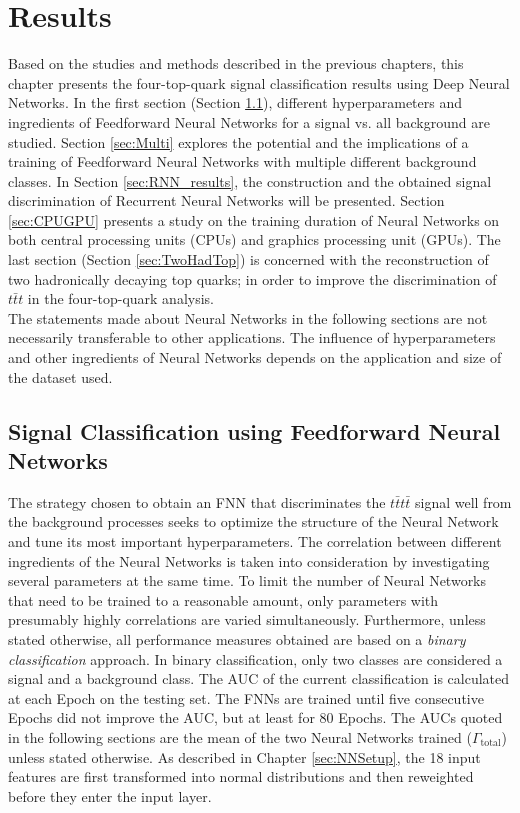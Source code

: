 \chapter{Results}
\label{sec:Results}

Based on the studies and methods described in the previous chapters, this chapter presents the four-top-quark signal classification results using Deep Neural Networks. In the first section (Section \ref{sec:FNN_results}), different hyperparameters and ingredients of Feedforward Neural Networks for a signal vs. all background are studied. Section \ref{sec:Multi} explores the potential and the implications of a training of Feedforward Neural Networks with multiple different background classes. In Section \ref{sec:RNN_results}, the construction and the obtained signal discrimination of Recurrent Neural Networks will be presented.
Section \ref{sec:CPUGPU} presents a study on the training duration of Neural Networks on both central processing units (CPUs) and graphics processing unit (GPUs). The last section (Section \ref{sec:TwoHadTop}) is concerned with the reconstruction of two hadronically decaying top quarks; in order to improve the discrimination of $t\bar{t}t$ in the four-top-quark analysis. \\
The statements made about Neural Networks in the following sections are not necessarily transferable to other applications. The influence of hyperparameters and other ingredients of Neural Networks depends on the application and size of the dataset used.

\section{Signal Classification using Feedforward Neural Networks}
\label{sec:FNN_results}

The strategy chosen to obtain an FNN that discriminates the $t\bar{t}t\bar{t}$ signal well from the background processes seeks to optimize the structure of the Neural Network and tune its most important hyperparameters. The correlation between different ingredients of the Neural Networks is taken into consideration by investigating several parameters at the same time. To limit the number of Neural Networks that need to be trained to a reasonable amount, only parameters with presumably highly correlations are varied simultaneously. Furthermore, unless stated otherwise, all performance measures obtained are based on a \textit{binary classification} approach. In binary classification, only two classes are considered a signal and a background class. The AUC of the current classification is calculated at each Epoch on the testing set. The FNNs are trained until five consecutive Epochs did not improve the AUC, but at least for 80 Epochs. The AUCs quoted in the following sections are the mean of the two Neural Networks trained ($\Gamma_{\text{total}}$) unless stated otherwise. As described in Chapter \ref{sec:NNSetup}, the 18 input features are first transformed into normal distributions and then reweighted before they enter the input layer.

